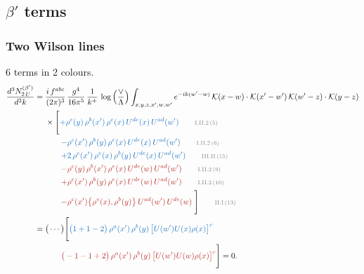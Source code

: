 \documentclass[10pt]{article}
\begin{document}
\subsection{$\beta'$ terms}
\subsubsection{Two Wilson lines}
6 terms in 2 colours.
\begin{align}
\frac{d^{3}N^{(\beta')}_{2\,U}}{d^{3}k}={}&\frac{i\,f^{abc}}{(2\pi)^{3}}\,\frac{g^{4}}{16\pi^{5}}\,\frac{1}{k^{+}}\,\log\Big(\frac{\vee}{\Lambda}\Big)\int_{x,y,z,x',w,w'}e^{-ik(w'-w)}\,\mathcal{K}(x-w)\cdot\mathcal{K}(x'-w')\,\mathcal{K}(w'-z)\cdot\mathcal{K}(y-z)\notag\\
&\times\Bigg[{\color{RoyalBlue}+\rho^{c}(y)\,\rho^{b}(x')\,\rho^{e}(x)\,U^{de}(x)\,U^{ad}(w')}\tag*{\color{gray}\scriptsize I.II.2\,(5)}\\
&\qquad{\color{RoyalBlue}-\rho^{c}(x')\,\rho^{b}(y)\,\rho^{e}(x)\,U^{de}(x)\,U^{ad}(w')}\tag*{\color{gray}\scriptsize I.II.2\,(6)}\\
&\qquad{\color{RoyalBlue}+2\,\rho^{c}(x')\,\rho^{e}(x)\,\rho^{b}(y)\,U^{de}(x)\,U^{ad}(w')}\tag*{\color{gray}\scriptsize III.II\,(15)}\\
&\qquad{\color{BrickRed}-\rho^{c}(y)\,\rho^{b}(x')\,\rho^{e}(x)\,U^{de}(w)\,U^{ad}(w')}\tag*{\color{gray}\scriptsize I.II.2\,(9)}\\
&\qquad{\color{BrickRed}+\rho^{c}(x')\,\rho^{b}(y)\,\rho^{e}(x)\,U^{de}(w)\,U^{ad}(w')}\tag*{\color{gray}\scriptsize I.II.2\,(10)}\\
&\qquad{\color{BrickRed}-\rho^{c}(x')\big\{\rho^{e}(x),\rho^{b}(y)\big\}\,U^{ad}(w')\,U^{de}(w)}\;\Bigg]\tag*{\color{gray}\scriptsize II.I\,(13)}\\
={}&\big(\cdots\big)\Bigg[{\color{RoyalBlue}\big(1+1-2\big)\,\rho^{a}(x')\,\rho^{b}(y)\,\big[U(w')U(x)\rho(x)\big]^{c}}\notag\\
&\qquad{\color{BrickRed}\big(-1-1+2\big)\,\rho^{a}(x')\,\rho^{b}(y)\,\big[U(w')U(w)\rho(x)\big]^{c}}\Bigg]=0.
\end{align}
\end{document}
